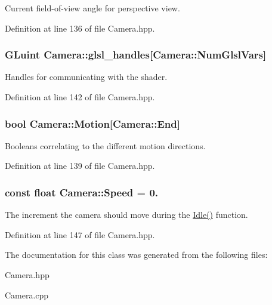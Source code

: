 Current field-\/of-\/view angle for perspective view. 



Definition at line 136 of file Camera.\-hpp.

\hypertarget{class_camera_a1635486d7f9e0d52b241899a270ee335}{
\subsubsection[{glsl\-\_\-handles}]{\setlength{\rightskip}{0pt plus 5cm}G\-Luint Camera\-::glsl\-\_\-handles\mbox{[}Camera\-::\-Num\-Glsl\-Vars\mbox{]}\hspace{0.3cm}{\ttfamily [private]}}}\label{class_camera_a1635486d7f9e0d52b241899a270ee335}


Handles for communicating with the shader. 



Definition at line 142 of file Camera.\-hpp.

\hypertarget{class_camera_a39746b4fadf30bba6bdc8aa6acfdc6f2}{
\subsubsection[{Motion}]{\setlength{\rightskip}{0pt plus 5cm}bool Camera\-::\-Motion\mbox{[}Camera\-::\-End\mbox{]}\hspace{0.3cm}{\ttfamily [private]}}}\label{class_camera_a39746b4fadf30bba6bdc8aa6acfdc6f2}


Booleans correlating to the different motion directions. 



Definition at line 139 of file Camera.\-hpp.

\hypertarget{class_camera_aedf8ba8b2af631a5a3e33b19bfa40322}{
\subsubsection[{Speed}]{\setlength{\rightskip}{0pt plus 5cm}const float Camera\-::\-Speed = 0.\hspace{0.3cm}{\ttfamily [static]}}}\label{class_camera_aedf8ba8b2af631a5a3e33b19bfa40322}


The increment the camera should move during the \hyperlink{class_camera_aec3559fe43597656629fdb00157d3c73}{Idle()} function. 



Definition at line 147 of file Camera.\-hpp.



The documentation for this class was generated from the following files\-:\begin{DoxyCompactItemize}
\item 
Camera.\-hpp\item 
Camera.\-cpp\end{DoxyCompactItemize}
